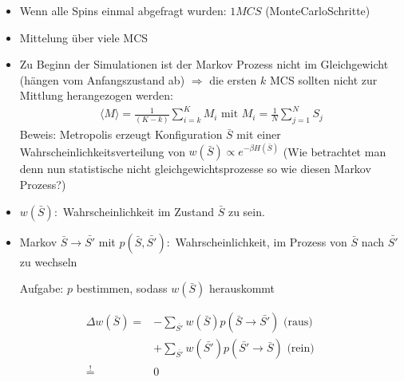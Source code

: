 \documentclass[12pt]{article}
\begin{document}
\begin{itemize}
\item Wenn alle Spins einmal abgefragt wurden: $1MCS$ (MonteCarloSchritte)
\item Mittelung über viele MCS

\item Zu Beginn der Simulationen ist der Markov Prozess nicht im Gleichgewicht (hängen vom Anfangszustand ab) $\Rightarrow$  die ersten $k$ MCS sollten nicht zur Mittlung herangezogen werden: \begin{align}
\langle M \rangle = \frac{1}{(K-k)} \sum_{i=k}^K M_i \mbox{ mit } M_i = \frac{1}{N} \sum_{j=1}^N S_j
\end{align}
Beweis: Metropolis erzeugt Konfiguration $\bar{S}$ mit einer Wahrscheinlichkeitsverteilung von $w(\bar{S}) \propto e^{-\beta H(\bar{S})}$ (Wie betrachtet man denn nun statistische nicht gleichgewichtsprozesse so wie diesen Markov Prozess?)
\item $w(\bar{S}):$ Wahrscheinlichkeit im Zustand $\bar{S}$ zu sein.
\item Markov $\bar{S} \rightarrow \bar{S'}$ mit $p(\bar{S}, \bar{S'}): $ Wahrscheinlichkeit, im Prozess von $\bar{S}$ nach $\bar{S'}$ zu wechseln

Aufgabe: $p$ bestimmen, sodass $w(\bar{S})$ herauskommt
\end{itemize} %
\begin{align*}
\Delta w(\bar{S}) =& 
- \sum_{\bar{S'}} w(\bar{S}) p(\bar{S} \rightarrow \bar{S'}) \mbox{ (raus) } \\
 &+  \sum_{\bar{S'}} w(\bar{S'}) p(\bar{S'} \rightarrow \bar{S}) \mbox{ (rein) } \\ 
 \overset{!}{=}& 0
\end{align*}

\end{document}
